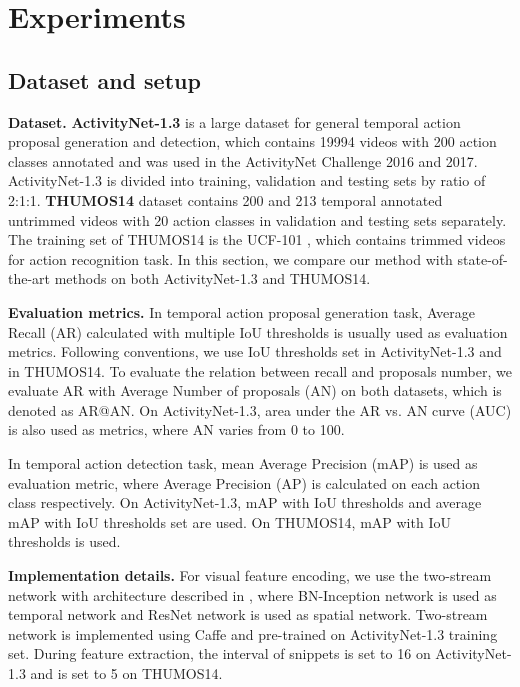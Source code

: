 \documentclass[runningheads]{llncs}
\begin{document}
\section{Experiments}

\subsection{Dataset and setup}
\noindent
{\bf Dataset.} {\bf ActivityNet-1.3} \cite{caba2015activitynet} is a large dataset for general temporal action proposal generation and detection, which contains 19994 videos   with 200 action classes annotated and was used in the ActivityNet Challenge 2016 and 2017. ActivityNet-1.3 is divided into training, validation and testing sets by ratio of 2:1:1. 
{\bf THUMOS14} \cite{jiang2014thumos} dataset contains 200 and 213 temporal annotated untrimmed videos with 20 action classes in validation and testing sets separately. The training set of THUMOS14 is the UCF-101 \cite{soomro2012ucf101}, which contains trimmed videos for action recognition task. 
In this section, we compare our method with state-of-the-art methods on both ActivityNet-1.3 and THUMOS14.

\noindent
{\bf Evaluation metrics.}
In temporal action proposal generation task, Average Recall (AR) calculated with multiple IoU thresholds is usually used as evaluation metrics. Following  conventions, we use IoU thresholds set  in ActivityNet-1.3 and  in THUMOS14. 
To evaluate the relation between recall and proposals number,  we evaluate AR with Average Number of proposals (AN) on both datasets, which is denoted as  AR@AN. 
On ActivityNet-1.3, area under the AR vs. AN curve (AUC) is also used as metrics, where AN varies from 0 to 100.

In temporal action detection task, mean Average Precision (mAP) is used as evaluation metric, where Average Precision (AP) is calculated on each action class respectively. On ActivityNet-1.3, mAP with IoU thresholds  and average mAP with IoU thresholds set  are used. On THUMOS14, mAP with IoU thresholds  is used.



\noindent
{\bf Implementation details.}
For visual feature encoding, we use the two-stream network \cite{simonyan2014two} with architecture described in \cite{xiong2016cuhk}, where BN-Inception network \cite{ioffe2015batch} is used as temporal network and ResNet network \cite{he2016deep} is used as spatial network. Two-stream network is implemented  using Caffe \cite{jia2014caffe} and pre-trained on ActivityNet-1.3 training set. During feature extraction,  the interval  of snippets is set to 16 on ActivityNet-1.3 and is set to 5 on THUMOS14.
\end{document}
